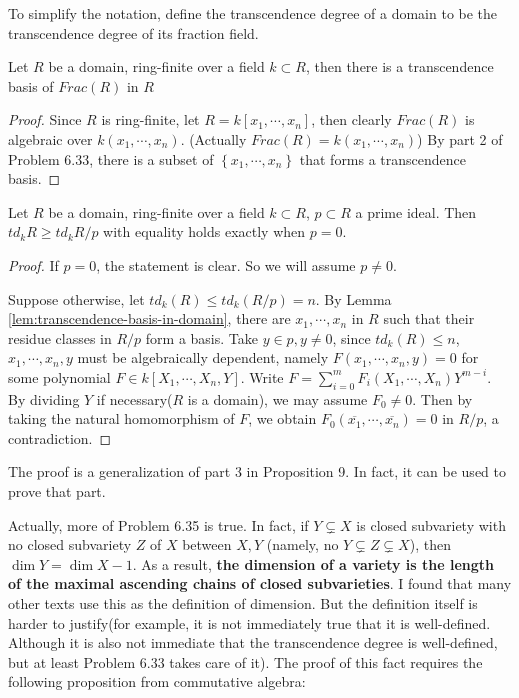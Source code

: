 \documentclass{solution}
\begin{document}
To simplify the notation, define the transcendence degree of a domain to be the transcendence degree of its fraction field.

\begin{lemma} \label{lem:transcendence-basis-in-domain}
    Let $R$ be a domain, ring-finite over a field $k \subset R$, then there is a transcendence basis of $Frac(R)$ in $R$
\end{lemma}

\begin{proof}
    Since $R$ is ring-finite, let $R = k[x_1, \cdots, x_n]$, then clearly $Frac(R)$ is algebraic over $k(x_1, \cdots, x_n)$. (Actually $Frac(R) = k(x_1, \cdots, x_n)$) By part 2 of Problem 6.33, there is a subset of $\left\lbrace x_1, \cdots, x_n \right\rbrace$ that forms a transcendence basis.
\end{proof}

\begin{lemma}
    Let $R$ be a domain, ring-finite over a field $k \subset R$, $p \subset R$ a prime ideal. Then $td_k R \ge td_k R / p$ with equality holds exactly when $p = 0$.
\end{lemma}

\begin{proof}
    If $p = 0$, the statement is clear. So we will assume $p \ne 0$.

    Suppose otherwise, let $td_k(R) \le td_k (R / p) = n$. By Lemma \ref{lem:transcendence-basis-in-domain}, there are $x_1, \cdots, x_n$ in $R$ such that their residue classes in $R / p$ form a basis. Take $y \in p, y \ne 0$, since $td_k(R) \le n$, $x_1, \cdots, x_n, y$ must be algebraically dependent, namely $F(x_1, \cdots, x_n, y) = 0$ for some polynomial $F \in k[X_1, \cdots, X_n, Y]$. Write $F = \sum\limits_{i = 0}^{m} F_i(X_1, \cdots, X_n) Y^{m - i}$. By dividing $Y$ if necessary($R$ is a domain), we may assume $F_0 \ne 0$. Then by taking the natural homomorphism of $F$, we obtain $F_0(\overline{x_1}, \cdots, \overline{x_n}) = 0$ in $R / p$, a contradiction.
\end{proof}

The proof is a generalization of part 3 in Proposition 9. In fact, it can be used to prove that part.

Actually, more of Problem 6.35 is true. In fact, if $Y \subsetneq X$ is closed subvariety with no closed subvariety $Z$ of $X$ between $X, Y$ (namely, no $Y \subsetneq Z \subsetneq X$), then $\dim Y = \dim X - 1$. As a result, \textbf{the dimension of a variety is the length of the maximal ascending chains of closed subvarieties}. I found that many other texts use this as the definition of dimension. But the definition itself is harder to justify(for example, it is not immediately true that it is well-defined. Although it is also not immediate that the transcendence degree is well-defined, but at least Problem 6.33 takes care of it). The proof of this fact requires the following proposition from commutative algebra:
\end{document}
